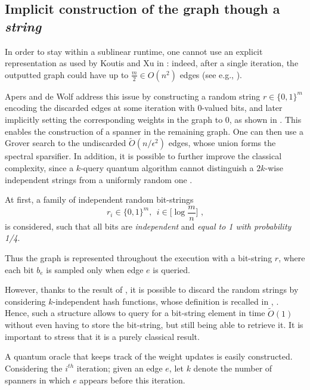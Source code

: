 \subsection{Implicit construction of the graph though a \textit{string}}

In order to stay within a sublinear runtime, one cannot use an explicit representation as
used by Koutis and Xu in : indeed, after a single iteration, 
the outputted graph could have up to $\frac m2\in O(n^2)$ edges (see e.g., ).

Apers and de Wolf address this issue by 
constructing a random string $r \in \{0,1\}^{m}$ encoding the discarded edges at some iteration with 0-valued bits, and later implicitly setting the corresponding weights in the graph to 0, as shown in 
.
This enables the construction of a spanner in the remaining graph.
One can then use a Grover search to the undiscarded $\tilde{O}(n/\epsilon^{2})$ edges, 
whose union forms the spectral sparsifier. In addition, it is possible to further improve the classical complexity, 
since  a $k$-query quantum algorithm cannot distinguish a $2k$-wise independent strings from a uniformly 
random one \cite{zhandry_secure_2015}.

At first, a family of independent random bit-strings 
$$r_i \in \{0,1\}^{m} \text{, } \; i \in \big[\log \frac mn\big] \text{ ,}$$
is considered, such that all bits are \emph{independent} and \emph{equal to 1 with probability 1/4}.

Thus the graph is represented throughout the execution with a bit-string $r$, where each 
bit $b_e$ is sampled only when edge $e$ is queried. 

However, thanks to the result of \citeauthor{zhandry_secure_2015}, it is possible to discard the random strings
by considering $k$-independent hash functions, whose definition is recalled in , . Hence,
 such a structure allows to query for a bit-string element in time $\tilde{O}(1)$
without even having to store the bit-string, but still being able to retrieve it.
It is important to stress that it is a purely classical result.




A quantum oracle that keeps track of the weight updates is easily constructed.
Considering the $i^{th}$ iteration; given an edge $e$, let $k$ denote the number
of spanners in which $e$ appears before this iteration.

